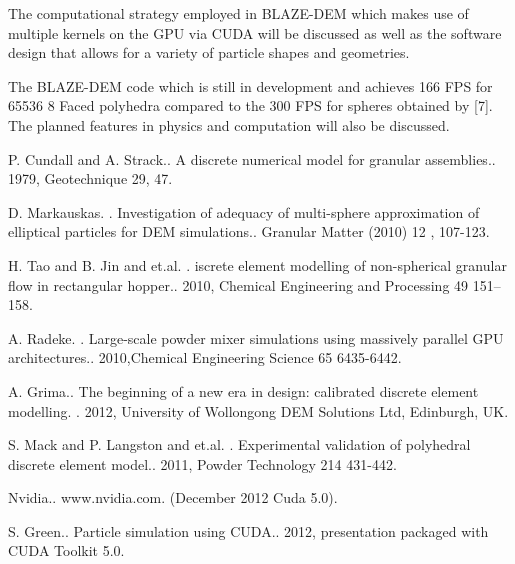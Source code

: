 \documentclass[article,A4,11pt]{llncs}%
\begin{document}
The computational strategy employed in BLAZE-DEM which makes use of multiple kernels on the GPU via CUDA will be discussed as well as the software design that allows for a variety of particle shapes and geometries. 

The BLAZE-DEM code which is still in development and achieves 166 FPS for 65536 8 Faced polyhedra compared to the 300 FPS for spheres obtained by [7]. The planned features in physics and computation will also be discussed.


\begin{thebibliography}{10}
{\sc P. Cundall and A. Strack.}. {A discrete numerical model for granular assemblies.}. 1979, Geotechnique 29, 47.

{\sc D. Markauskas. }. {Investigation of adequacy of multi-sphere approximation of elliptical particles for DEM simulations.}. Granular Matter (2010) 12 , 107-123.

{\sc H. Tao and B. Jin and et.al. }. {iscrete element modelling of non-spherical granular flow in rectangular hopper.}. 2010, Chemical Engineering and Processing 49 151–158.

{\sc A. Radeke. }. {Large-scale powder mixer simulations using massively parallel GPU architectures.}.  2010,Chemical Engineering Science 65 6435-6442.

{\sc A. Grima.}. {The beginning of a new era in design: calibrated discrete element modelling. }. 2012, University of Wollongong DEM Solutions Ltd, Edinburgh, UK.

{\sc S. Mack and P. Langston and et.al. }. {Experimental validation of polyhedral discrete element model.}. 2011, Powder Technology 214 431-442.

{ Nvidia.}. {www.nvidia.com}. (December 2012 Cuda 5.0).

{\sc S. Green.}. {Particle simulation using CUDA.}. 2012, presentation packaged with CUDA Toolkit 5.0.
\end{thebibliography}
\end{document}
